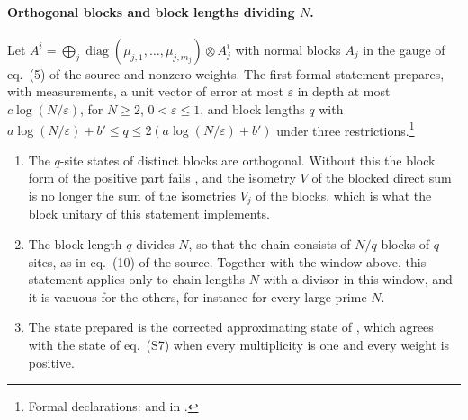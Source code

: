 \documentclass{article}
\begin{document}
\paragraph{Orthogonal blocks and block lengths dividing $N$.}
Let $A^i=\bigoplus_j\operatorname{diag}(\mu_{j,1},\dots,\mu_{j,m_j})\otimes A_j^i$
with normal blocks $A_j$ in the gauge of eq.~(5) of the source and nonzero
weights. The first formal statement prepares, with measurements, a unit vector
of error at most $\varepsilon$ in depth at most $c\log(N/\varepsilon)$, for
$N\geq2$, $0<\varepsilon\leq1$, and block lengths $q$ with
$a\log(N/\varepsilon)+b'\leq q\leq2(a\log(N/\varepsilon)+b')$ under three
restrictions.\footnote{Formal declarations:
    and
    in .}
\begin{enumerate}
    \item The $q$-site states of distinct blocks are orthogonal. Without this the
          block form of the positive part fails
          \cite{gap:mswc24_block_form_mixed_overlap}, and the isometry $V$ of the
          blocked direct sum is no longer the sum of the isometries $V_j$ of the
          blocks, which is what the block unitary of this statement implements.
    \item The block length $q$ divides $N$, so that the chain consists of
          $N/q$ blocks of $q$ sites, as in eq.~(10) of the source. Together with
          the window above, this statement applies only to chain lengths $N$
          with a divisor in this window, and it is vacuous for the others, for
          instance for every large prime $N$.
    \item The state prepared is the corrected approximating state of
          \cite{gap:mswc24_repeated_block_corrected_state}, which agrees with
          the state of eq.~(S7) when every multiplicity is one and every weight
          is positive.
\end{enumerate}
\end{document}
